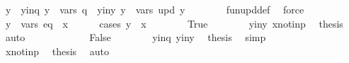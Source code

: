 \begin{isabellebody}
\ y{\isacharprime}{\kern0pt}\ \ y{\isacharprime}{\kern0pt}{\isacharunderscore}{\kern0pt}in{\isacharunderscore}{\kern0pt}q{\isacharcolon}{\kern0pt}\ {\isachardoublequoteopen}y{\isacharprime}{\kern0pt}\ {\isasymin}\ vars\ q{\isachardoublequoteclose}\ \ y{\isacharunderscore}{\kern0pt}in{\isacharunderscore}{\kern0pt}y{\isacharprime}{\kern0pt}{\isacharcolon}{\kern0pt}\ {\isachardoublequoteopen}y\ {\isasymin}\ vars\ {\isacharparenleft}{\kern0pt}{\isacharquery}{\kern0pt}upd\ y{\isacharprime}{\kern0pt}{\isacharparenright}{\kern0pt}{\isachardoublequoteclose}\isanewline
\ \ \ \ \ \ \isamarkupfalse%
\ fun{\isacharunderscore}{\kern0pt}upd{\isacharunderscore}{\kern0pt}def\ \isamarkupfalse%
\ force\isanewline
\ \ \ \ \isamarkupfalse%
\ {\isachardoublequoteopen}y\ {\isasymin}\ vars\ eq\ {\isacharminus}{\kern0pt}\ {\isacharbraceleft}{\kern0pt}x{\isacharbraceright}{\kern0pt}{\isachardoublequoteclose}\isanewline
\ \ \ \ \isamarkupfalse%
\ {\isacharparenleft}{\kern0pt}cases\ {\isachardoublequoteopen}y{\isacharprime}{\kern0pt}\ {\isacharequal}{\kern0pt}\ x{\isachardoublequoteclose}{\isacharparenright}{\kern0pt}\isanewline
\ \ \ \ \ \ \isamarkupfalse%
\ True\isanewline
\ \ \ \ \ \ \isamarkupfalse%
\ y{\isacharunderscore}{\kern0pt}in{\isacharunderscore}{\kern0pt}y{\isacharprime}{\kern0pt}\ x{\isacharunderscore}{\kern0pt}not{\isacharunderscore}{\kern0pt}in{\isacharunderscore}{\kern0pt}p\ \isamarkupfalse%
\ {\isacharquery}{\kern0pt}thesis\ \isamarkupfalse%
\ auto\isanewline
\ \ \ \ \isamarkupfalse%
\isanewline
\ \ \ \ \ \ \isamarkupfalse%
\ False\isanewline
\ \ \ \ \ \ \isamarkupfalse%
\ y{\isacharprime}{\kern0pt}{\isacharunderscore}{\kern0pt}in{\isacharunderscore}{\kern0pt}q\ y{\isacharunderscore}{\kern0pt}in{\isacharunderscore}{\kern0pt}y{\isacharprime}{\kern0pt}\ \isamarkupfalse%
\ {\isacharquery}{\kern0pt}thesis\ \isamarkupfalse%
\ simp\isanewline
\ \ \ \ \isamarkupfalse%
\isanewline
\ \ \isamarkupfalse%
\isanewline
\ \ \isamarkupfalse%
\ x{\isacharunderscore}{\kern0pt}not{\isacharunderscore}{\kern0pt}in{\isacharunderscore}{\kern0pt}p\ \isamarkupfalse%
\ {\isacharquery}{\kern0pt}thesis\ \isamarkupfalse%
\ auto\isanewline
{}\isamarkupfalse%
%
\endisatagproof

\end{isabellebody}
